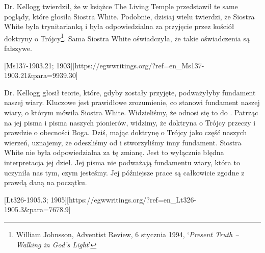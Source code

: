 
Dr. Kellogg twierdził, że w książce The Living Temple przedstawił te same poglądy, które głosiła Siostra White. Podobnie, dzisiaj wielu twierdzi, że Siostra White była trynitarianką i była odpowiedzialna za przyjęcie przez kościół doktryny o Trójcy\footnote{William Johnsson, Adventist Review, 6 stycznia 1994, ‘\textit{Present Truth –Walking in God's Light}’}. Sama Siostra White oświadczyła, że takie oświadczenia są fałszywe.

[Ms137-1903.21; 1903][https://egwwritings.org/?ref=en\_Ms137-1903.21&para=9939.30]

Dr. Kellogg głosił teorie, które, gdyby zostały przyjęte, podważyłyby fundament naszej wiary. Kluczowe jest prawidłowe zrozumienie, co stanowi fundament naszej wiary, o którym mówiła Siostra White. Widzieliśmy, że odnosi się to do . Patrząc na jej pisma i pisma naszych pionierów, widzimy, że doktryna o Trójcy przeczy  i prawdzie o obecności Boga. Dziś, mając doktrynę o Trójcy jako część naszych wierzeń, uznajemy, że odeszliśmy od  i stworzyliśmy inny fundament. Siostra White nie była odpowiedzialna za tę zmianę. Jest to wyłącznie błędna interpretacja jej dzieł. Jej pisma nie podważają fundamentu wiary, która to uczyniła nas tym, czym jesteśmy. Jej późniejsze prace są całkowicie zgodne z prawdą daną na początku.

[Lt326-1905.3; 1905][https://egwwritings.org/?ref=en\_Lt326-1905.3&para=7678.9]

